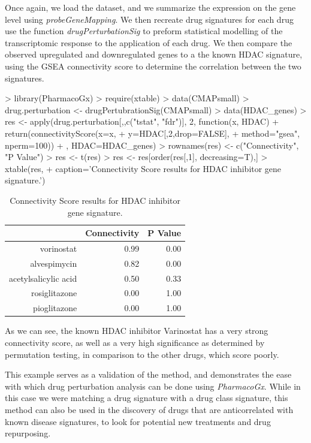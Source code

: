 \documentclass[11pt]{article}
\begin{document}
Once again, we load the dataset, and we summarize the expression on the gene level using \textit{probeGeneMapping}. We then recreate drug signatures for each drug use the function \textit{drugPerturbationSig} to preform statistical modelling of the transcriptomic response to the application of each drug. We then compare the observed upregulated and downregulated genes to a the known HDAC signature, using the GSEA connectivity score to determine the correlation between the two signatures. 

\begin{Schunk}
\begin{Sinput}
>   library(PharmacoGx)
>   require(xtable)
>   data(CMAPsmall)
>   drug.perturbation <- drugPertubrationSig(CMAPsmall)
>   data(HDAC_genes)
>   res <- apply(drug.perturbation[,,c("tstat", "fdr")], 2, function(x, HDAC){ 
+ 	    return(connectivityScore(x=x, 
+ 	                             y=HDAC[,2,drop=FALSE], 
+ 	                             method="gsea", nperm=100))
+ 	}, HDAC=HDAC_genes)
>   rownames(res) <- c("Connectivity", "P Value")
>   res <- t(res)
>   res <- res[order(res[,1], decreasing=T),]
>   xtable(res, 
+     caption='Connectivity Score results for HDAC inhibitor gene signature.')
\end{Sinput}
\begin{table}[ht]
\centering
\begin{tabular}{rrr}
  \hline
 & Connectivity & P Value \\ 
  \hline
vorinostat & 0.99 & 0.00 \\ 
  alvespimycin & 0.82 & 0.00 \\ 
  acetylsalicylic acid & 0.50 & 0.33 \\ 
  rosiglitazone & 0.00 & 1.00 \\ 
  pioglitazone & 0.00 & 1.00 \\ 
   \hline
\end{tabular}
\caption{Connectivity Score results for HDAC inhibitor gene signature.} 
\end{table}\end{Schunk}
As we can see, the known HDAC inhibitor Varinostat has a very strong connectivity score, as well as a very high significance as determined by permutation testing, in comparison to the other drugs, which score poorly. 

This example serves as a validation of the method, and demonstrates the ease with which drug perturbation analysis can be done using \textit{PharmacoGx}. While in this case we were matching a drug signature with a drug class signature, this method can also be used in the discovery of drugs that are anticorrelated with known disease signatures, to look for potential new treatments and drug repurposing. 
\end{document}
